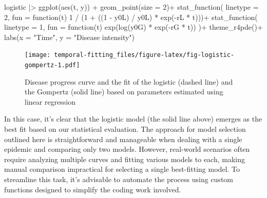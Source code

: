 \documentclass[
  letterpaper,
]{book}
\newenvironment{Shaded}{\begin{snugshade}}{\end{snugshade}}
\newcommand{\AttributeTok}[1]{\textcolor[rgb]{0.40,0.45,0.13}{#1}}
\newcommand{\ControlFlowTok}[1]{\textcolor[rgb]{0.00,0.23,0.31}{#1}}
\newcommand{\DecValTok}[1]{\textcolor[rgb]{0.68,0.00,0.00}{#1}}
\newcommand{\FunctionTok}[1]{\textcolor[rgb]{0.28,0.35,0.67}{#1}}
\newcommand{\NormalTok}[1]{\textcolor[rgb]{0.00,0.23,0.31}{#1}}
\newcommand{\SpecialCharTok}[1]{\textcolor[rgb]{0.37,0.37,0.37}{#1}}
\newcommand{\StringTok}[1]{\textcolor[rgb]{0.13,0.47,0.30}{#1}}
\begin{document}
\begin{Shaded}
\begin{Highlighting}[]
\NormalTok{logistic }\SpecialCharTok{|\textgreater{}}
  \FunctionTok{ggplot}\NormalTok{(}\FunctionTok{aes}\NormalTok{(t, y)) }\SpecialCharTok{+}
  \FunctionTok{geom\_point}\NormalTok{(}\AttributeTok{size =} \DecValTok{2}\NormalTok{)}\SpecialCharTok{+}
  \FunctionTok{stat\_function}\NormalTok{(}
    \AttributeTok{linetype =} \DecValTok{2}\NormalTok{,}
    \AttributeTok{fun =} \ControlFlowTok{function}\NormalTok{(t) }\DecValTok{1} \SpecialCharTok{/}\NormalTok{ (}\DecValTok{1} \SpecialCharTok{+}\NormalTok{ ((}\DecValTok{1} \SpecialCharTok{{-}}\NormalTok{ y0L) }\SpecialCharTok{/}\NormalTok{ y0L) }\SpecialCharTok{*} \FunctionTok{exp}\NormalTok{(}\SpecialCharTok{{-}}\NormalTok{rL }\SpecialCharTok{*}\NormalTok{ t)))}\SpecialCharTok{+}
\FunctionTok{stat\_function}\NormalTok{(}
    \AttributeTok{linetype =} \DecValTok{1}\NormalTok{,}
    \AttributeTok{fun =} \ControlFlowTok{function}\NormalTok{(t) }\FunctionTok{exp}\NormalTok{(}\FunctionTok{log}\NormalTok{(y0G) }\SpecialCharTok{*} \FunctionTok{exp}\NormalTok{(}\SpecialCharTok{{-}}\NormalTok{rG }\SpecialCharTok{*}\NormalTok{ t))}
\NormalTok{  )}\SpecialCharTok{+}
  \FunctionTok{theme\_r4pde}\NormalTok{()}\SpecialCharTok{+}
  \FunctionTok{labs}\NormalTok{(}\AttributeTok{x =} \StringTok{"Time"}\NormalTok{, }\AttributeTok{y =} \StringTok{"Disease intensity"}\NormalTok{)}
\end{Highlighting}
\end{Shaded}

\begin{figure}

{\centering \texttt{[image: temporal-fitting\_files/figure-latex/fig-logistic-gompertz-1.pdf]}

}

\caption{\label{fig-logistic-gompertz}Disease progress curve and the fit
of the logistic (dashed line) and the Gompertz (solid line) based on
parameters estimated using linear regression}

\end{figure}

In this case, it's clear that the logistic model (the solid line above)
emerges as the best fit based on our statistical evaluation. The
approach for model selection outlined here is straightforward and
manageable when dealing with a single epidemic and comparing only two
models. However, real-world scenarios often require analyzing multiple
curves and fitting various models to each, making manual comparison
impractical for selecting a single best-fitting model. To streamline
this task, it's advisable to automate the process using custom functions
designed to simplify the coding work involved.
\end{document}
